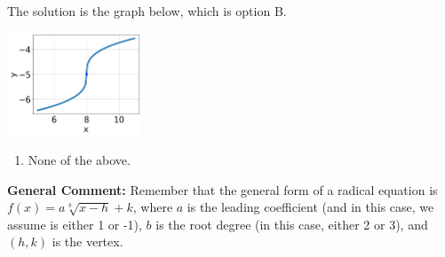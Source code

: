 \documentclass{extbook}[14pt]
\begin{document}
\begin{enumerate}
{The solution is the graph below, which is option B.
\begin{center}
    \includegraphics[width=0.3\textwidth]{../Figures/radicalEquationToGraphCopyBA.png}
\end{center}\begin{enumerate}[label=\Alph*.]
\item None of the above.\end{enumerate}
\textbf{General Comment:} Remember that the general form of a radical equation is $ f(x) = a \sqrt[b]{x - h} + k $, where $a$ is the leading coefficient (and in this case, we assume is either 1 or -1), $b$ is the root degree (in this case, either 2 or 3), and $(h, k)$ is the vertex.
}
\end{enumerate}
\end{document}
